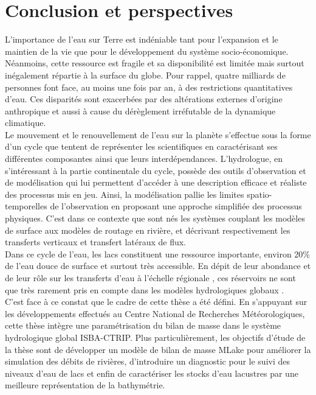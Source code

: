 \chapter*{{\selectfont Conclusion et perspectives}}
\label{chap:conclu_persp}


L'importance de l'eau sur Terre est indéniable tant pour l'expansion et le maintien de la vie que pour le développement du système socio-économique. Néanmoins, cette ressource est fragile et sa disponibilité est limitée mais surtout inégalement répartie à la surface du globe. Pour rappel, quatre milliards de personnes font face, au moins une fois par an, à des restrictions quantitatives d'eau. Ces disparités sont exacerbées par des altérations externes d'origine anthropique et aussi à cause du dérèglement irréfutable de la dynamique climatique. \\
Le mouvement et le renouvellement de l'eau sur la planète s'effectue sous la forme d'un cycle que tentent de représenter les scientifiques en caractérisant ses différentes composantes ainsi que leurs interdépendances. L'hydrologue, en s'intéressant à la partie continentale du cycle, possède des outils d'observation et de modélisation qui lui permettent d'accéder à une description efficace et réaliste des processus mis en jeu. Ainsi, la modélisation pallie les limites spatio-temporelles de l'observation en proposant une approche simplifiée des processus physiques. C'est dans ce contexte que sont nés les systèmes couplant les modèles de surface aux modèles de routage en rivière, et décrivant respectivement les transferts verticaux et transfert latéraux de flux. \\
Dans ce cycle de l'eau, les lacs constituent une ressource importante, environ 20\% de l'eau douce de surface et surtout très accessible. En dépit de leur abondance et de leur rôle sur les transferts d'eau à l'échelle régionale \citep{bowling2010}, ces réservoirs ne sont que très rarement pris en compte dans les modèles hydrologiques globaux \citep{downing2010}.\\

C'est face à ce constat que le cadre de cette thèse a été défini. En s'appuyant sur les développements effectués au Centre National de Recherches Météorologiques, cette thèse intègre une paramétrisation du bilan de masse dans le système hydrologique global ISBA-CTRIP. Plus particulièrement, les objectifs d'étude de la thèse sont de développer un modèle de bilan de masse MLake pour améliorer la simulation des débits de rivières, d'introduire un diagnostic pour le suivi des niveaux d'eau de lacs et enfin de caractériser les stocks d'eau lacustres par une meilleure représentation de la bathymétrie.\\

